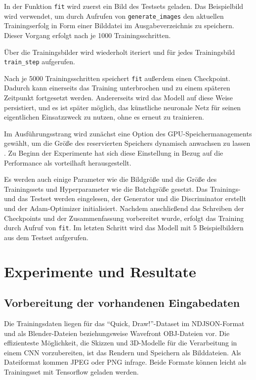 In der Funktion \lstinline|fit| wird zuerst ein Bild des Testsets geladen. Das Beispielbild wird verwendet, um durch Aufrufen von \lstinline|generate_images| den aktuellen Trainingserfolg in Form einer Bilddatei im Ausgabeverzeichnis zu speichern. Dieser Vorgang erfolgt nach je 1000 Trainingsschritten.

Über die Trainingsbilder wird wiederholt iteriert und für jedes Trainingsbild \lstinline|train_step| aufgerufen.

Nach je 5000 Trainingsschritten speichert \lstinline|fit| außerdem einen Checkpoint. Dadurch kann einerseits das Training unterbrochen und zu einem späteren Zeitpunkt fortgesetzt werden. Andererseits wird das Modell auf diese Weise persistiert, und es ist später möglich, das künstliche neuronale Netz für seinen eigentlichen Einsatzzweck zu nutzen, ohne es erneut zu trainieren.

Im Ausführungsstrang wird zunächst eine Option des GPU-Speichermanagements gewählt, um die Größe des reservierten Speichers dynamisch anwachsen zu lassen \cite{zaccone2018tensorflow}. Zu Beginn der Experimente hat sich diese Einstellung in Bezug auf die Performance als vorteilhaft herausgestellt.

Es werden auch einige Parameter wie die Bildgröße und die Größe des Trainingssets und Hyperparameter wie die Batchgröße gesetzt. Das Trainings- und das Testset werden eingelesen, der Generator und die Discriminator erstellt und der Adam-Optimizer initialisiert. Nachdem anschließend das Schreiben der Checkpoints und der Zusammenfassung vorbereitet wurde, erfolgt das Training durch Aufruf von \lstinline|fit|. Im letzten Schritt wird das Modell mit 5 Beispielbildern aus dem Testset aufgerufen.

\chapter{Experimente und Resultate}
\label{ch:conduct}

\section{Vorbereitung der vorhandenen Eingabedaten}
\label{sec:preparation}
Die Trainingsdaten liegen für das ``Quick, Draw!''-Dataset im NDJSON-Format und als Blender-Dateien beziehungsweise
Wavefront OBJ-Dateien vor. Die effizienteste Möglichkeit, die Skizzen und 3D-Modelle für die Verarbeitung in einem CNN vorzubereiten, ist das Rendern und  Speichern als Bilddateien. Als Dateiformat kommen JPEG oder PNG infrage. Beide Formate können leicht als Trainingsset mit Tensorflow geladen werden.

